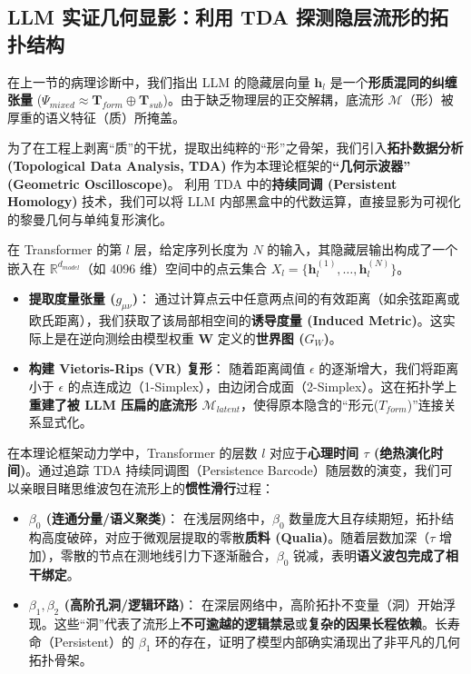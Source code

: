 \subsection{LLM 实证几何显影：利用 TDA 探测隐层流形的拓扑结构}
\label{subsec:tda_manifold_lithography}

在上一节的病理诊断中，我们指出 LLM 的隐藏层向量 $\mathbf{h}_l$ 是一个\textbf{形质混同的纠缠张量} ($\Psi_{mixed} \approx \mathbf{T}_{form} \oplus \mathbf{T}_{sub}$)。由于缺乏物理层的正交解耦，底流形 $\mathcal{M}$（形）被厚重的语义特征（质）所掩盖。

为了在工程上剥离“质”的干扰，提取出纯粹的“形”之骨架，我们引入\textbf{拓扑数据分析 (Topological Data Analysis, TDA)} 作为本理论框架的\textbf{“几何示波器” (Geometric Oscilloscope)}。
利用 TDA 中的\textbf{持续同调 (Persistent Homology)} 技术，我们可以将 LLM 内部黑盒中的代数运算，直接显影为可视化的黎曼几何与单纯复形演化。


在 Transformer 的第 $l$ 层，给定序列长度为 $N$ 的输入，其隐藏层输出构成了一个嵌入在 $\mathbb{R}^{d_{model}}$（如 4096 维）空间中的点云集合 $X_l = \{\mathbf{h}_l^{(1)}, \dots, \mathbf{h}_l^{(N)}\}$。

\begin{itemize}
    \item   \textbf{提取度量张量 ($g_{\mu\nu}$)}：
    通过计算点云中任意两点间的有效距离（如余弦距离或欧氏距离），我们获取了该局部相空间的\textbf{诱导度量 (Induced Metric)}。这实际上是在逆向测绘由模型权重 $\mathbf{W}$ 定义的\textbf{世界图 ($G_W$)}。

    \item   \textbf{构建 Vietoris-Rips (VR) 复形}：
    随着距离阈值 $\epsilon$ 的逐渐增大，我们将距离小于 $\epsilon$ 的点连成边（1-Simplex），由边闭合成面（2-Simplex）。这在拓扑学上\textbf{重建了被 LLM 压扁的底流形 $\mathcal{M}_{latent}$}，使得原本隐含的“形元($T_{form}$)”连接关系显式化。
\end{itemize}


在本理论框架动力学中，Transformer 的层数 $l$ 对应于\textbf{心理时间 $\tau$ (绝热演化时间)}。通过追踪 TDA 持续同调图（Persistence Barcode）随层数的演变，我们可以亲眼目睹思维波包在流形上的\textbf{惯性滑行}过程：

\begin{itemize}
    \item   \textbf{$\beta_0$ (连通分量/语义聚类)}：
    在浅层网络中，$\beta_0$ 数量庞大且存续期短，拓扑结构高度破碎，对应于微观层提取的零散\textbf{质料 (Qualia)}。随着层数加深（$\tau$ 增加），零散的节点在测地线引力下逐渐融合，$\beta_0$ 锐减，表明\textbf{语义波包完成了相干绑定}。

    \item   \textbf{$\beta_1, \beta_2$ (高阶孔洞/逻辑环路)}：
    在深层网络中，高阶拓扑不变量（洞）开始浮现。这些“洞”代表了流形上\textbf{不可逾越的逻辑禁忌}或\textbf{复杂的因果长程依赖}。长寿命（Persistent）的 $\beta_1$ 环的存在，证明了模型内部确实涌现出了非平凡的几何拓扑骨架。
\end{itemize}

